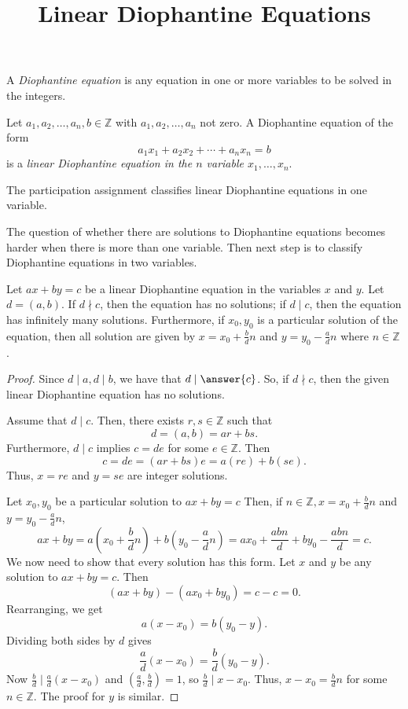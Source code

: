 \documentclass{../ximera}
\title{Linear Diophantine Equations}
\begin{document}
\begin{abstract}
\end{abstract}
\maketitle


\begin{definition}
    A \emph{Diophantine equation} is any equation in one or more variables to be solved in the integers.
   \end{definition}
    
    
   \begin{definition}
    Let $a_1,a_2,\dots,a_n,b\in\mathbb{Z}$ with $a_1,a_2,\dots,a_n$ not zero. A Diophantine equation of the form \[a_1x_1+a_2x_2+\cdots+a_nx_n=b\] is a \emph{linear Diophantine equation in the $n$ variable $x_1,\dots,x_n$}.
   \end{definition}
    
   The participation assignment classifies linear Diophantine equations in one variable.
    
   The question of whether there are solutions to Diophantine equations becomes harder when there is more than one variable. Then next step is to classify Diophantine equations in two variables.
    
\begin{theorem}\label{thm:linear-dioph}
    Let $ax+by=c$ be a linear Diophantine equation in the variables $x$ and $y$. Let $d=(a,b)$. If $d\nmid c$, then the equation has no solutions; if $d\mid c$, then the equation has infinitely many solutions. Furthermore, if $x_0,y_0$ is a particular solution of the equation, then all solution are given by $x=x_0+\frac{b}{d}n$ and $y=y_0-\frac{a}{d}n$ where $n\in\mathbb{Z}$.
   
    \begin{proof}
        Since $d\mid a,d\mid b$, we have that $d\mid\answer{c}$. So, if $d\nmid c$, then the given linear Diophantine equation has no solutions.
     
        Assume that $d\mid c$. Then, there exists $r,s\in\mathbb{Z}$ such that \[d=(a,b)=ar+bs.\] Furthermore, $d\mid c$ implies $c=de$ for some $e\in\mathbb{Z}$. Then \[c=de=(ar+bs)e=a(re)+b(se).\]
        Thus, $x=re$ and $y=se$ are integer solutions.
     
        Let $x_0,y_0$ be a particular solution to $ax+by=c$ Then, if $n\in\mathbb{Z}, x=x_0+\frac{b}{d}n$ and $y=y_0-\frac{a}{d}n$, \[ax+by=a(x_0+\frac{b}{d}n)+b(y_0-\frac{a}{d}n)=ax_0+\frac{abn}{d}+by_0-\frac{abn}{d}=c.\] We now need to show that every solution has this form. Let $x$ and $y$ be any solution to $ax+by=c$. Then \[(ax+by)-(ax_0+by_0)=c-c=0.\] Rearranging, we get \[a(x-x_0)=b(y_0-y).\] Dividing both sides by $d$ gives \[\frac{a}{d}(x-x_0)=\frac{b}{d}(y_0-y).\] Now $\frac{b}{d}\mid \frac{a}{d}(x-x_0)$ and $(\frac{a}{d},\frac{b}{d})=1$, so $\frac{b}{d}\mid x-x_0$. Thus, $x-x_0=\frac{b}{d}n$ for some $n\in\mathbb{Z}$. The proof for $y$ is similar.
    \end{proof}
\end{theorem}
    
\end{document}
